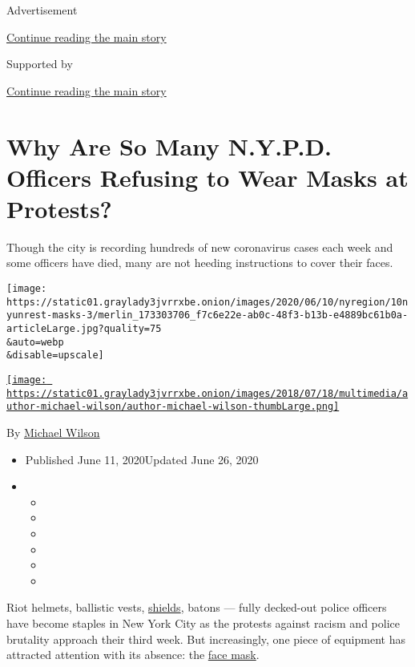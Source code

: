 Advertisement

\protect\hyperlink{after-top}{Continue reading the main story}

Supported by

\protect\hyperlink{after-sponsor}{Continue reading the main story}

\hypertarget{why-are-so-many-nypd-officers-refusing-to-wear-masks-at-protests}{%
\section{Why Are So Many N.Y.P.D. Officers Refusing to Wear Masks at
Protests?}\label{why-are-so-many-nypd-officers-refusing-to-wear-masks-at-protests}}

Though the city is recording hundreds of new coronavirus cases each week
and some officers have died, many are not heeding instructions to cover
their faces.

\texttt{[image: https://static01.graylady3jvrrxbe.onion/images/2020/06/10/nyregion/10nyunrest-masks-3/merlin\_173303706\_f7c6e22e-ab0c-48f3-b13b-e4889bc61b0a-articleLarge.jpg?quality=75\\\&auto=webp\\\&disable=upscale]}

\href{https://www.nytimes3xbfgragh.onion/by/michael-wilson}{\texttt{[image: https://static01.graylady3jvrrxbe.onion/images/2018/07/18/multimedia/author-michael-wilson/author-michael-wilson-thumbLarge.png]}}

By \href{https://www.nytimes3xbfgragh.onion/by/michael-wilson}{Michael
Wilson}

\begin{itemize}
\item
  Published June 11, 2020Updated June 26, 2020
\item
  \begin{itemize}
  \item
  \item
  \item
  \item
  \item
  \item
  \end{itemize}
\end{itemize}

Riot helmets, ballistic vests,
\href{https://www.nytimes3xbfgragh.onion/article/face-shield-mask-california-coronavirus.html}{shields},
batons --- fully decked-out police officers have become staples in New
York City as the protests against racism and police brutality approach
their third week. But increasingly, one piece of equipment has attracted
attention with its absence: the
\href{https://www.nytimes3xbfgragh.onion/2020/08/12/us/fl-sheriff-billy-woods-bans-masks.html}{face
mask}.

